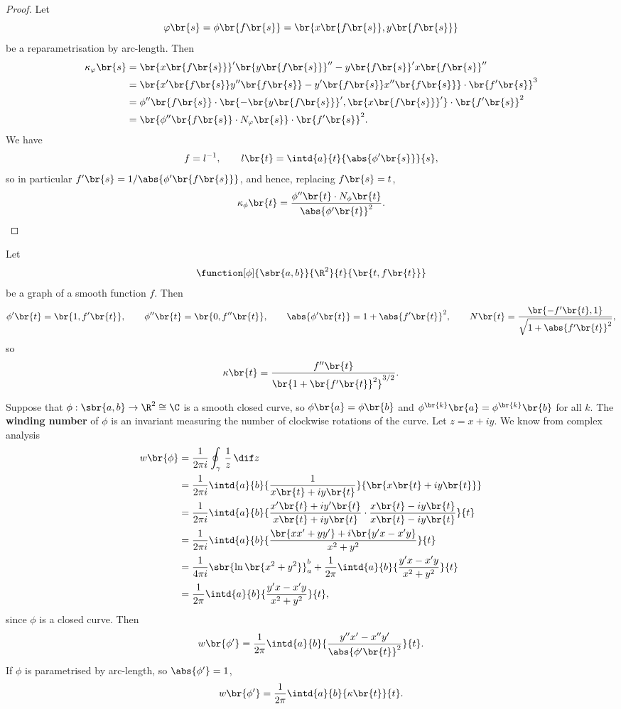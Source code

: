\begin{proof}
Let
$$ \varphi\br{s} = \phi\br{f\br{s}} = \br{x\br{f\br{s}}, y\br{f\br{s}}} $$
be a reparametrisation by arc-length. Then
\begin{align*}
\kappa_\varphi\br{s}
& = \br{x\br{f\br{s}}}'\br{y\br{f\br{s}}}'' - y\br{f\br{s}}'x\br{f\br{s}}'' \\
& = \br{x'\br{f\br{s}}y''\br{f\br{s}} - y'\br{f\br{s}}x''\br{f\br{s}}} \cdot \br{f'\br{s}}^3 \\
& = \phi''\br{f\br{s}} \cdot \br{-\br{y\br{f\br{s}}}', \br{x\br{f\br{s}}}'} \cdot \br{f'\br{s}}^2 \\
& = \br{\phi''\br{f\br{s}} \cdot N_\varphi\br{s}} \cdot \br{f'\br{s}}^2.
\end{align*}
We have
$$ f = l^{-1}, \qquad l\br{t} = \intd{a}{t}{\abs{\phi'\br{s}}}{s}, $$
so in particular $ f'\br{s} = 1 / \abs{\phi'\br{f\br{s}}} $, and hence, replacing $ f\br{s} = t $,
$$ \kappa_\phi\br{t} = \dfrac{\phi''\br{t} \cdot N_\phi\br{t}}{\abs{\phi'\br{t}}^2}. $$
\end{proof}

\begin{example*}
Let
$$ \function[\phi]{\sbr{a, b}}{\R^2}{t}{\br{t, f\br{t}}} $$
be a graph of a smooth function $ f $. Then
$$ \phi'\br{t} = \br{1, f'\br{t}}, \qquad \phi''\br{t} = \br{0, f''\br{t}}, \qquad \abs{\phi'\br{t}} = 1 + \abs{f'\br{t}}^2, \qquad N\br{t} = \dfrac{\br{-f'\br{t}, 1}}{\sqrt{1 + \abs{f'\br{t}}^2}}, $$
so
$$ \kappa\br{t} = \dfrac{f''\br{t}}{\br{1 + \br{f'\br{t}}^2}^{3 / 2}}. $$
\end{example*}

\pagebreak

Suppose that $ \phi : \sbr{a, b} \to \R^2 \cong \C $ is a smooth closed curve, so $ \phi\br{a} = \phi\br{b} $ and $ \phi^{\br{k}}\br{a} = \phi^{\br{k}}\br{b} $ for all $ k $. The \textbf{winding number} of $ \phi $ is an invariant measuring the number of clockwise rotations of the curve. Let $ z = x + iy $. We know from complex analysis
\begin{align*}
w\br{\phi}
& = \dfrac{1}{2\pi i} \oint_\gamma \, \dfrac{1}{z} \, \dif z \\
& = \dfrac{1}{2\pi i} \intd{a}{b}{\dfrac{1}{x\br{t} + iy\br{t}}}{\br{x\br{t} + iy\br{t}}} \\
& = \dfrac{1}{2\pi i} \intd{a}{b}{\dfrac{x'\br{t} + iy'\br{t}}{x\br{t} + iy\br{t}} \cdot \dfrac{x\br{t} - iy\br{t}}{x\br{t} - iy\br{t}}}{t} \\
& = \dfrac{1}{2\pi i} \intd{a}{b}{\dfrac{\br{xx' + yy'} + i\br{y'x - x'y}}{x^2 + y^2}}{t} \\
& = \dfrac{1}{4\pi i} \sbr{\ln\br{x^2 + y^2}}_a^b + \dfrac{1}{2\pi} \intd{a}{b}{\dfrac{y'x - x'y}{x^2 + y^2}}{t} \\
& = \dfrac{1}{2\pi} \intd{a}{b}{\dfrac{y'x - x'y}{x^2 + y^2}}{t},
\end{align*}
since $ \phi $ is a closed curve. Then
$$ w\br{\phi'} = \dfrac{1}{2\pi} \intd{a}{b}{\dfrac{y''x' - x''y'}{\abs{\phi'\br{t}}^2}}{t}. $$
If $ \phi $ is parametrised by arc-length, so $ \abs{\phi'} = 1 $,
$$ w\br{\phi'} = \dfrac{1}{2\pi} \intd{a}{b}{\kappa\br{t}}{t}. $$

